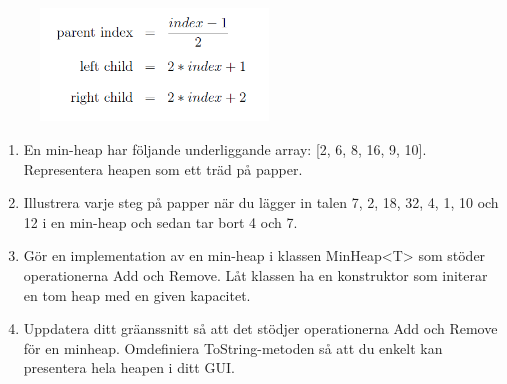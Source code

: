 \documentclass{article}
\begin{document}
  \begin{figure}[h]
  \centering
  \includegraphics[height=3cm]{x.png}
    \end{figure}
  \begin{enumerate}
  \item En min-heap har följande underliggande array: [2, 6, 8, 16, 9, 10]. Representera heapen som ett träd på papper.
  \item Illustrera varje steg på papper när du lägger in talen 7, 2, 18, 32, 4, 1, 10 och 12 i en  min-heap och sedan tar bort 4 och 7.
  \item Gör en implementation av en min-heap i klassen MinHeap<T> som stöder operationerna Add och Remove. Låt klassen ha en konstruktor som initerar en tom heap med en given kapacitet.
  \item Uppdatera ditt gräanssnitt så att det stödjer operationerna Add och Remove för en minheap. Omdefiniera ToString-metoden så att du enkelt kan presentera hela heapen i ditt
  GUI.
  \end{enumerate}
 
\end{document}
